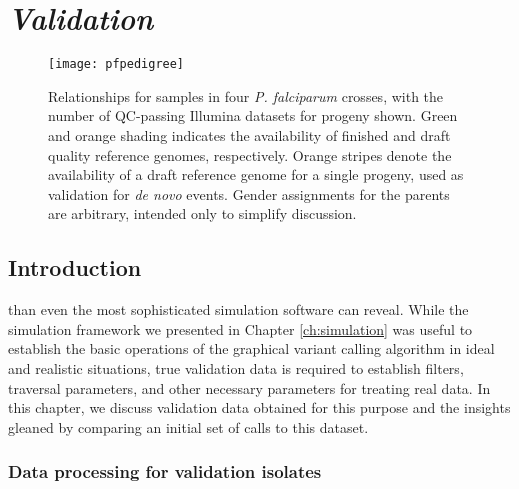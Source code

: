 \chapter{\textit{Validation}}
\label{ch:realdata}

\begin{figure}[h!]
  \centering
    \texttt{[image: pfpedigree]}
  \caption{Relationships for samples in four \textit{P. falciparum} crosses, with the number of QC-passing Illumina datasets for progeny shown.  Green and orange shading indicates the availability of finished and draft quality reference genomes, respectively.  Orange stripes denote the availability of a draft reference genome for a single progeny, used as validation for \textit{de novo} events.  Gender assignments for the parents are arbitrary, intended only to simplify discussion.}
  \label{fig:pfpedigree}
\end{figure}

\section{Introduction}

 than even the most sophisticated simulation software can reveal.  While the simulation framework we presented in Chapter \ref{ch:simulation} was useful to establish the basic operations of the graphical variant calling algorithm in ideal and realistic situations, true validation data is required to establish filters, traversal parameters, and other necessary parameters for treating real data.  In this chapter, we discuss validation data obtained for this purpose and the insights gleaned by comparing an initial set of calls to this dataset.

\subsection{Data processing for validation isolates}

